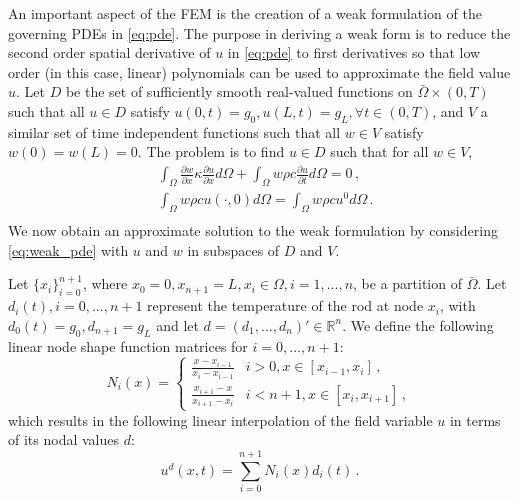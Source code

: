 \documentclass[letterpaper, 10 pt, conference]{ieeeconf/ieeeconf}
\newcommand*{\R}{\mathbb{R}}
\begin{document}
An important aspect of the FEM is the creation of a weak formulation of the
governing PDEs in \cref{eq:pde}. The purpose in deriving a weak form is to
reduce the second order spatial derivative of $u$ in \cref{eq:pde} to first
derivatives so that low order (in this case, linear) polynomials can be used to
approximate the field value $u$. Let $D$ be the set of sufficiently smooth 
real-valued functions on $\bar{\Omega} \times (0, T)$ such that all 
$u \in D$ satisfy $u(0, t) = g_0, u(L, t) = g_L, \forall t \in (0, T)$, 
and $V$ a similar set of time
independent functions such that all $w \in V$ satisfy $w(0) = w(L) = 0$. 
The problem is to find $u \in D$ such that for all $w \in V$,
%
\begin{equation}\label{eq:weak_pde}
    \begin{aligned}
        &\int_{\Omega} \frac{\partial w}{\partial x} \kappa \frac{\partial
        u}{\partial x} d \Omega + 
        \int_{\Omega} w \rho c \frac{\partial u}{\partial t} d \Omega = 0 \,, \\
        &\int_{\Omega} w \rho c u(\cdot, 0) d \Omega =
        \int_{\Omega} w \rho c u^0 d \Omega \,. \\
    \end{aligned}
\end{equation}
%
We now obtain an approximate solution to the weak formulation by considering
\cref{eq:weak_pde} with $u$ and $w$ in subspaces of $D$ and $V$.

Let $\{x_i\}_{i = 0}^{n +
1}$, where $x_0 = 0, x_{n+1} = L, x_i \in \Omega, i = 1,...,n$, be a partition of
$\bar\Omega$. Let $d_i(t), i = 0,...,n+1$ represent the
temperature of the rod at node $x_i$, with $d_0(t) = g_0, d_{n+1} = g_L$ and let $d = (d_1, ..., d_n)' \in
\R^n$. We define the following linear node shape function matrices for $i =
0,...,n+1$:
%
\begin{equation}
    N_i(x) = \begin{cases}
        \frac{x - x_{i - 1}}{x_i - x_{i - 1}} & i > 0, x \in [x_{i-1}, x_i] \,, \\
        \frac{x_{i+1} - x}{x_{i+1} - x_{i}} & i < n+1, x \in [x_{i}, x_{i+1}] \,,
    \end{cases} 
\end{equation}
%
which results in the following linear interpolation of the field variable $u$ in
terms of its nodal values $d$:
%
\begin{equation}
    u^d(x, t) = \sum_{i=0}^{n+1} N_i(x) d_i(t) \,.
\end{equation}
\end{document}
